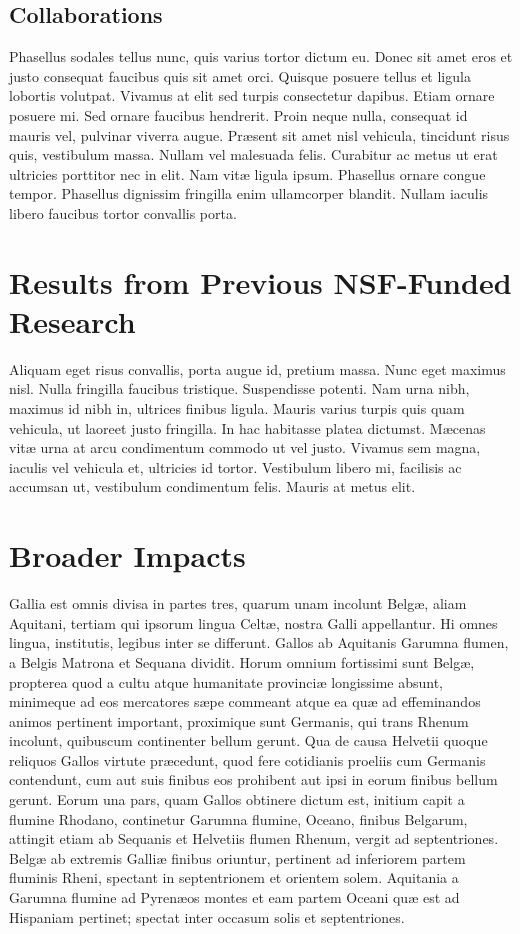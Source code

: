 \documentclass[12pt]{article}
\begin{document}
\subsection{Collaborations}
Phasellus sodales tellus nunc, quis varius tortor dictum eu. Donec sit amet eros et justo consequat faucibus quis sit amet orci. Quisque posuere tellus et ligula lobortis volutpat. Vivamus at elit sed turpis consectetur dapibus. Etiam ornare posuere mi. Sed ornare faucibus hendrerit. Proin neque nulla, consequat id mauris vel, pulvinar viverra augue. Pr{\ae}sent sit amet nisl vehicula, tincidunt risus quis, vestibulum massa. Nullam vel malesuada felis. Curabitur ac metus ut erat ultricies porttitor nec in elit. Nam vit{\ae} ligula ipsum. Phasellus ornare congue tempor. Phasellus dignissim fringilla enim ullamcorper blandit. Nullam iaculis libero faucibus tortor convallis porta. 


\section{Results from Previous NSF-Funded Research}%

Aliquam eget risus convallis, porta augue id, pretium massa. Nunc eget maximus nisl. Nulla fringilla faucibus tristique. Suspendisse potenti. Nam urna nibh, maximus id nibh in, ultrices finibus ligula. Mauris varius turpis quis quam vehicula, ut laoreet justo fringilla. In hac habitasse platea dictumst. M{\ae}cenas vit{\ae} urna at arcu condimentum commodo ut vel justo. Vivamus sem magna, iaculis vel vehicula et, ultricies id tortor. Vestibulum libero mi, facilisis ac accumsan ut, vestibulum condimentum felis. Mauris at metus elit.

\section{Broader Impacts}

Gallia est omnis divisa in partes tres, quarum unam incolunt Belg{\ae}, aliam Aquitani, tertiam qui ipsorum lingua Celt{\ae}, nostra Galli appellantur.  Hi omnes lingua, institutis, legibus inter se differunt. Gallos ab Aquitanis Garumna flumen, a Belgis Matrona et Sequana dividit.  Horum omnium fortissimi sunt Belg{\ae}, propterea quod a cultu atque humanitate provinci{\ae} longissime absunt, minimeque ad eos mercatores s{\ae}pe commeant atque ea qu{\ae} ad effeminandos animos pertinent important, proximique sunt Germanis, qui trans Rhenum incolunt, quibuscum continenter bellum gerunt. Qua de causa Helvetii quoque reliquos Gallos virtute pr{\ae}cedunt, quod fere cotidianis proeliis cum Germanis contendunt, cum aut suis finibus eos prohibent aut ipsi in eorum finibus bellum gerunt. Eorum una pars, quam Gallos obtinere dictum est, initium capit a flumine Rhodano, continetur Garumna flumine, Oceano, finibus Belgarum, attingit etiam ab Sequanis et Helvetiis flumen Rhenum, vergit ad septentriones.  Belg{\ae} ab extremis Galli{\ae} finibus oriuntur, pertinent ad inferiorem partem fluminis Rheni, spectant in septentrionem et orientem solem.  Aquitania a Garumna flumine ad Pyren{\ae}os montes et eam partem Oceani qu{\ae} est ad Hispaniam pertinet; spectat inter occasum solis et septentriones.


\vfil\eject

\end{document}
